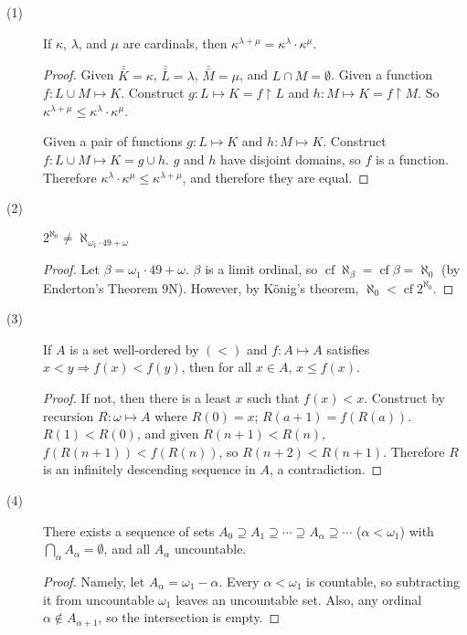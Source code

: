 \documentclass[12pt]{article}
\DeclareMathOperator{\cf}{cf}
\newcommand{\card}[1]{\bar{\bar{#1}}}
\begin{document}
\begin{description}
\item[(1)]
  If $\kappa$, $\lambda$, and $\mu$ are cardinals, then $\kappa^{\lambda
  + \mu} = \kappa^\lambda \cdot \kappa^\mu$.
  \begin{proof}
	Given $\card{K} = \kappa$, $\card{L} = \lambda$, $\card{M} = \mu$,
	and $L \cap M = \emptyset$.  Given a function $f: L \cup M \mapsto
	K$.  Construct $g: L \mapsto K = f \upharpoonright L$ and $h: M
	\mapsto K = f \upharpoonright M$.  So $\kappa^{\lambda + \mu} \le
	\kappa^\lambda \cdot \kappa^\mu$.

	Given a pair of functions $g: L \mapsto K$ and $h: M \mapsto K$.
	Construct $f: L \cup M \mapsto K = g \cup h$.  $g$ and $h$ have
	disjoint domains, so $f$ is a function.  Therefore $\kappa^\lambda
	\cdot \kappa^\mu \le \kappa^{\lambda + \mu}$, and therefore they are
	equal.
  \end{proof}

\item[(2)]
  $2^{\aleph_0} \neq \aleph_{\omega_1 \cdot 49 + \omega}$
  \begin{proof} 
    Let $\beta = \omega_1 \cdot 49 + \omega$.  $\beta$ is a limit ordinal, 
	so $\cf{\aleph_\beta} = \cf{\beta} = \aleph_0$ (by Enderton's
	Theorem 9N).  However, by K\"onig's theorem, $\aleph_0 <
	\cf{2^{\aleph_0}}$.
  \end{proof}

\item[(3)]
  If $A$ is a set well-ordered by $(<)$ and $f:A \mapsto A$ satisfies $x
  < y \Rightarrow f(x) < f(y)$, then for all $x \in A$, $x \le f(x)$.
  \begin{proof}
	If not, then there is a least $x$ such that $f(x) < x$.  Construct
	by recursion $R:\omega \mapsto A$ where $R(0) = x$; $R(a+1) =
	f(R(a))$.  $R(1) < R(0)$, and given $R(n+1) < R(n)$, $f(R(n+1)) <
	f(R(n))$, so $R(n+2) < R(n+1)$.  Therefore $R$ is an infinitely
	descending sequence in $A$, a contradiction.
  \end{proof}

\item[(4)]
  There exists a sequence of sets $A_0 \supseteq A_1 \supseteq \cdots \supseteq
  A_\alpha \supseteq \cdots$ ($\alpha < \omega_1$) with
  $\bigcap\limits_{\alpha}{A_\alpha} = \emptyset$, and all $A_\alpha$
  uncountable.  
  \begin{proof}
    Namely, let $A_\alpha = \omega_1 - \alpha$.  Every
    $\alpha < \omega_1$ is countable, so subtracting it from uncountable
    $\omega_1$ leaves an uncountable set.  Also, any ordinal $\alpha
    \notin A_{\alpha+1}$, so the intersection is empty.
  \end{proof}
  

\end{description}
\end{document}
